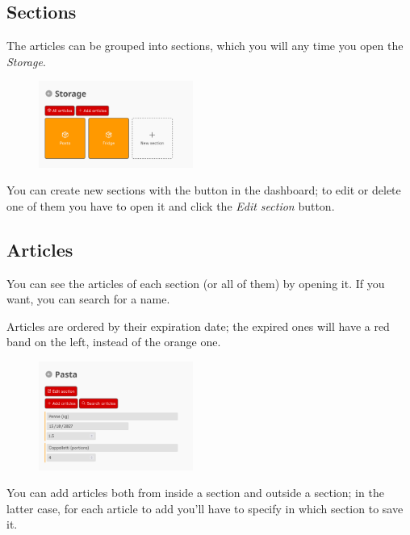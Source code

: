 \documentclass[12pt, a4paper]{article}
\begin{document}
	\subsection{Sections}

    The articles can be grouped into sections, which you will any time you open
    the \emph{Storage}.

    \begin{figure}[H]
        \centering
        \includegraphics[width=0.45\textwidth]{assets/en/storage.png}
    \end{figure}

    You can create new sections with the button in the dashboard; to edit or
    delete one of them you have to open it and click the \emph{Edit section}
    button.

    \subsection{Articles}

    You can see the articles of each section (or all of them) by opening it.
    If you want, you can search for a name.

    Articles are ordered by their expiration date; the expired ones will have a
    red band on the left, instead of the orange one.

    \begin{figure}[H]
        \centering
        \includegraphics[width=0.45\textwidth]{assets/en/articles.png}
    \end{figure}

    You can add articles both from inside a section and outside a section; in
    the latter case, for each article to add you'll have to specify in which
    section to save it.
\end{document}
